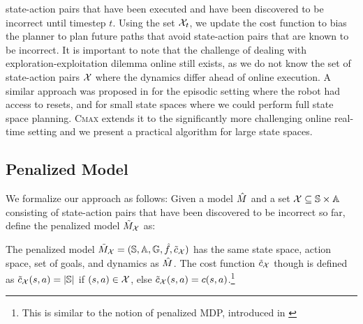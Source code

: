 state-action pairs that have been executed and have been discovered to
be incorrect until timestep $t$. Using the set $\mathcal{X}_t$, we update the cost
function to bias the planner to plan future paths that avoid
state-action pairs that are known to be incorrect.
It is
important to note that the challenge of dealing with
exploration-exploitation dilemma online still exists, as we do not
know the set of state-action pairs $\mathcal{X}$ where the dynamics differ ahead of online
execution. A similar approach was proposed in \cite{DBLP:conf/aaai/Jiang18} for the
episodic setting where the robot had access to resets, and for small
state spaces where we could perform full state space planning.
\textsc{Cmax}
extends it to the significantly more challenging 
online real-time setting and we present a practical algorithm for
large state spaces. 

\subsection{Penalized Model}
\label{sec:penalized-model}

We formalize
our approach
as follows: Given a model
$\hat{M}$ and a set $\mathcal{X} \subseteq \mathbb{S}
\times \mathbb{A}$ consisting of state-action pairs that have been
discovered to be incorrect so far, define the penalized model $\tilde{M}_{\mathcal{X}}$ as:
\begin{definition}
  The penalized model $\tilde{M}_{\mathcal{X}} = (\mathbb{S},
  \mathbb{A}, \mathbb{G},
  \hat{f}, \tilde{c}_{\mathcal{X}})$ has the same state space,
  action space, set of goals, and dynamics as $\hat{M}$. The
  cost function $\tilde{c}_{\mathcal{X}}$ though
  is defined as $\tilde{c}_{\mathcal{X}}(s, a) = |\mathbb{S}|$ if $(s, a) \in
  \mathcal{X}$, else $\tilde{c}_{\mathcal{X}}(s, a) =
  c(s,a)$.\footnote{This is similar to the notion of penalized MDP,
    introduced in \cite{DBLP:conf/aaai/Jiang18}}
  \label{def:penalized-mdp}
\end{definition}


